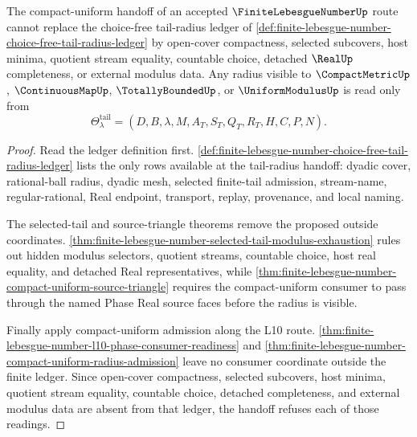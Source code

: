 \begin{theorem}
\label{thm:finite-lebesgue-number-compact-uniform-choice-refusal}
The compact-uniform handoff of an accepted $\FiniteLebesgueNumberUp$ route cannot replace the choice-free tail-radius ledger of \autoref{def:finite-lebesgue-number-choice-free-tail-radius-ledger} by open-cover compactness, selected subcovers, host minima, quotient stream equality, countable choice, detached $\RealUp$ completeness, or external modulus data. Any radius visible to $\CompactMetricUp$, $\ContinuousMapUp$, $\TotallyBoundedUp$, or $\UniformModulusUp$ is read only from
$$
\Theta_{\lambda}^{\mathrm{tail}}=(D,B,\lambda,M,A_T,S_T,Q_T,R_T,H,C,P,N).
$$
\end{theorem}
\begin{proof}
Read the ledger definition first. \autoref{def:finite-lebesgue-number-choice-free-tail-radius-ledger} lists the only rows available at the tail-radius handoff: dyadic cover, rational-ball radius, dyadic mesh, selected finite-tail admission, stream-name, regular-rational, Real endpoint, transport, replay, provenance, and local naming.

The selected-tail and source-triangle theorems remove the proposed outside coordinates. \autoref{thm:finite-lebesgue-number-selected-tail-modulus-exhaustion} rules out hidden modulus selectors, quotient streams, countable choice, host real equality, and detached Real representatives, while \autoref{thm:finite-lebesgue-number-compact-uniform-source-triangle} requires the compact-uniform consumer to pass through the named Phase Real source faces before the radius is visible.

Finally apply compact-uniform admission along the L10 route. \autoref{thm:finite-lebesgue-number-l10-phase-consumer-readiness} and \autoref{thm:finite-lebesgue-number-compact-uniform-radius-admission} leave no consumer coordinate outside the finite ledger. Since open-cover compactness, selected subcovers, host minima, quotient stream equality, countable choice, detached completeness, and external modulus data are absent from that ledger, the handoff refuses each of those readings.
\end{proof}
